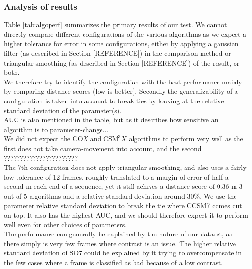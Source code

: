 \documentclass[12pt]{article}
\begin{document}
\subsubsection{Analysis of results}
%
Table \ref{tab:algoperf} summarizes the primary results of our test. We cannot directly compare different configurations of the various algorithms as we expect a higher tolerance for error in some configurations, either by applying a gaussian filter (as described in Section [REFERENCE]) in the comparison method or triangular smoothing (as described in Section [REFERENCE]) of the result, or both.\\
We therefore try to identify the configuration with the best performance mainly by comparing distance scores (low is better). Secondly the generalizability of a configuration is taken into account to break ties by looking at the relative standard deviation of the parameter(s).\\
AUC is also mentioned in the table, but as it describes how sensitive an algorithm is to parameter-change...\\
We did not expect the CO\textit{X} and $\text{CSM}^{3}\textit{X}$ algorithms to perform very well as the first does not take camera-movement into account, and the second ???????????????????????\\
The 7th configuration does not apply triangular smoothing, and also uses a fairly low tolerance of 12 frames, roughly translated to a margin of error of half a second in each end of a sequence, yet it still achives a distance score of $0.36$ in 3 out of 5 algorithms and a relative standard deviation around $30\%$. We use the parameter relative standard deviation to break the tie where CCSM7 comes out on top. It also has the highest AUC, and we should therefore expect it to perform well even for other choices of parameters.\\
The performance can generally be explained by the nature of our dataset, as there simply is very few frames where contrast is an issue. The higher relative standard deviation of SO7 could be explained by it trying to overcompensate in the few cases where a frame is classified as bad because of a low contrast.
%
\end{document}
